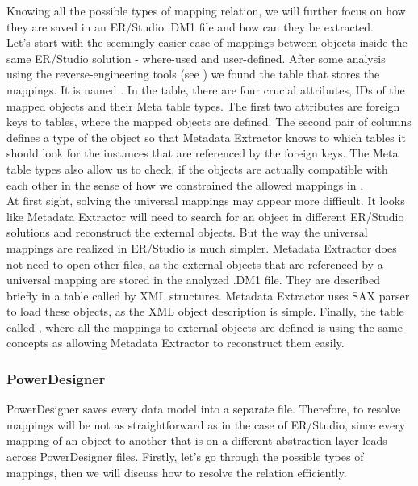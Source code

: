 Knowing all the possible types of mapping relation, we will further focus on how they are saved in an ER/Studio .DM1 file and how can they be extracted. \\ 

Let's start with the seemingly easier case of mappings between objects inside the same ER/Studio solution - where-used and user-defined. 
After some analysis using the reverse-engineering tools (see ) we found the table that stores the mappings. It is named .
In the table, there are four crucial attributes, IDs of the mapped objects and their Meta table types.
The first two attributes are foreign keys to tables, where the mapped objects are defined. The second pair of columns defines a type of the object so that Metadata Extractor knows to which tables it should look for the instances that are referenced by the foreign keys. 
The Meta table types also allow us to check, if the objects are actually compatible with each other in the sense of how we constrained the allowed mappings in . \\

At first sight, solving the universal mappings may appear more difficult. It looks like Metadata Extractor will need to search for an object in different ER/Studio solutions and reconstruct the external objects. 
But the way the universal mappings are realized in ER/Studio is much simpler. 
Metadata Extractor does not need to open other files, as the external objects that are referenced by a universal mapping are stored in the analyzed .DM1 file. 
They are described briefly in a table called  by XML structures.
Metadata Extractor uses SAX parser to load these objects, as the XML object description is simple.
Finally, the table called , where all the mappings to external objects are defined is using the same concepts as  allowing Metadata Extractor to reconstruct them easily.

\subsubsection{PowerDesigner}

PowerDesigner saves every data model into a separate file. Therefore, to resolve mappings will be not as straightforward as in the case of ER/Studio, since every mapping of an object to another that is on a different abstraction layer leads across PowerDesigner files.
Firstly, let's go through the possible types of mappings, then we will discuss how to resolve the relation efficiently.

